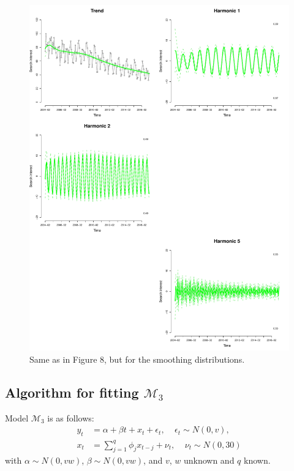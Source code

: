 \documentclass[12pt]{article}
\begin{document}
\begin{figure}[H]
\begin{center}
\includegraphics[scale=0.40]{figs/m2_smooth_components.pdf}
\end{center}
\caption{Same as in Figure 8, but for the smoothing distributions.}
\end{figure}

\newpage

\subsection*{Algorithm for fitting $\mathcal{M}_3$}

\noindent Model $\mathcal{M}_3$ is as follows:
\begin{align*}
y_t &= \alpha + \beta t + x_t + \epsilon_t,~~~~~\epsilon_t \sim N(0, v), \\
x_t &= \sum_{j=1}^q\phi_j x_{t-j} + \nu_t,~~~~~\nu_t \sim N(0, 30)
\end{align*}
\noindent with $\alpha \sim N(0, vw)$, $\beta\sim N(0, vw)$, and $v$, $w$ unknown and $q$ known.
\bigskip
\end{document}

